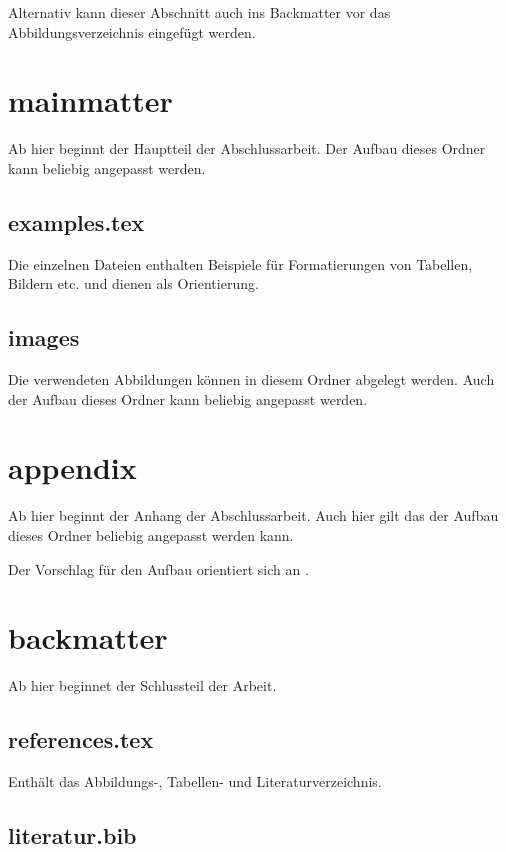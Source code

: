 Alternativ kann dieser Abschnitt auch ins Backmatter vor das Abbildungsverzeichnis eingefügt werden.

\section*{mainmatter}
\label{section:_A_mainmatter}

Ab hier beginnt der Hauptteil der Abschlussarbeit. Der Aufbau dieses Ordner kann beliebig angepasst werden.

\subsection*{examples.tex}

Die einzelnen Dateien enthalten Beispiele für Formatierungen von Tabellen, Bildern etc. und dienen als Orientierung.

\subsection*{images}

Die verwendeten Abbildungen können in diesem Ordner abgelegt werden. Auch der Aufbau dieses Ordner kann beliebig angepasst werden.

\section*{appendix}

Ab hier beginnt der Anhang der Abschlussarbeit. Auch hier gilt das der Aufbau dieses Ordner beliebig angepasst werden kann.

Der Vorschlag für den Aufbau orientiert sich an .

\section*{backmatter}

Ab hier beginnet der Schlussteil der Arbeit.

\subsection*{references.tex}

Enthält das Abbildungs-, Tabellen- und Literaturverzeichnis. 

\subsection*{literatur.bib}

